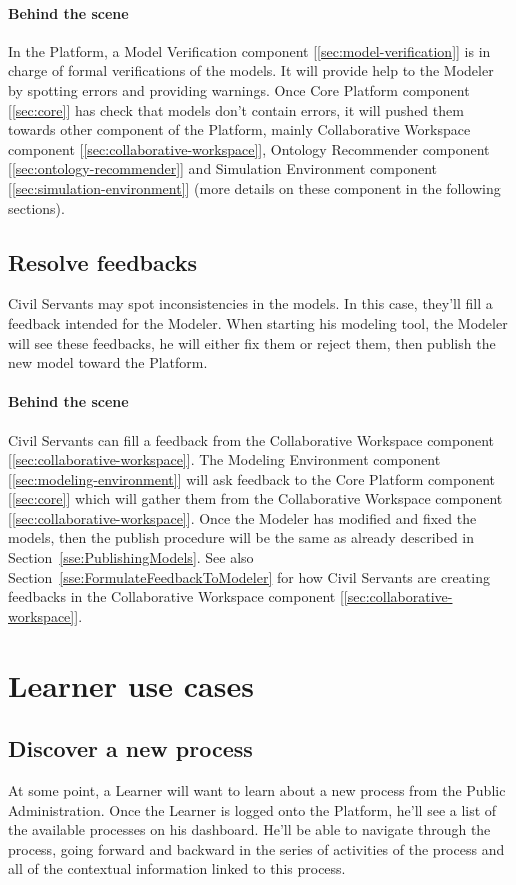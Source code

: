 \documentclass{learnpad}
\begin{document}
\paragraph{Behind the scene}
In the \learnpad Platform, a Model Verification component
[\ref{sec:model-verification}] is in charge of formal verifications of the
models.  It will provide help to the Modeler by spotting errors and providing
warnings.  Once \learnpad Core Platform component [\ref{sec:core}] has check
that models don't contain errors, it will pushed them towards other component of
the \learnpad Platform, mainly Collaborative Workspace component
[\ref{sec:collaborative-workspace}], Ontology Recommender component
[\ref{sec:ontology-recommender}] and Simulation Environment component
[\ref{sec:simulation-environment}] (more details on these component in the
following sections).

\subsection{Resolve feedbacks}
Civil Servants may spot inconsistencies in the models.  In this case, they'll
fill a feedback intended for the Modeler.  When starting his modeling tool, the
Modeler will see these feedbacks, he will either fix them or reject them, then
publish the new model toward the \learnpad Platform.

\paragraph{Behind the scene}
Civil Servants can fill a feedback from the Collaborative Workspace component
[\ref{sec:collaborative-workspace}].  The Modeling Environment component
[\ref{sec:modeling-environment}] will ask feedback to the \learnpad Core
Platform component [\ref{sec:core}] which will gather them from the
Collaborative Workspace component [\ref{sec:collaborative-workspace}].  Once the
Modeler has modified and fixed the models, then the publish procedure will be
the same as already described in Section~\ref{sse:PublishingModels}.  See also
Section~\ref{sse:FormulateFeedbackToModeler} for how Civil Servants are creating
feedbacks in the Collaborative Workspace component
[\ref{sec:collaborative-workspace}].

\section{Learner use cases}
\subsection{Discover a new process}
At some point, a Learner will want to learn about a new process from the Public
Administration.  Once the Learner is logged onto the \learnpad Platform, he'll
see a list of the available processes on his dashboard.  He'll be able to
navigate through the process, going forward and backward in the series of
activities of the process and all of the contextual information linked to this
process.
\end{document}
